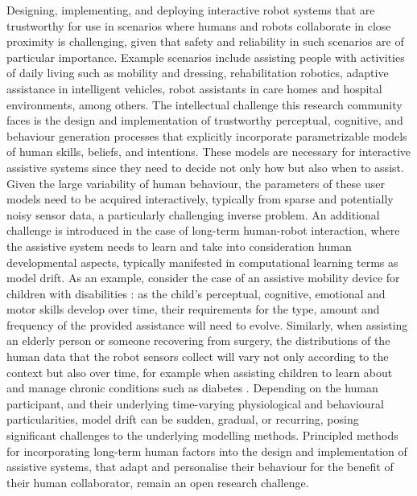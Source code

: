 \documentclass[sigconf]{acmart}
\begin{document}
Designing, implementing, and deploying interactive robot systems that are trustworthy for use in scenarios where humans and robots collaborate in close proximity is challenging, given that safety and reliability in such scenarios are of particular importance. Example scenarios include assisting people with activities of daily living such as mobility \cite{SohDemiris2015} and dressing\cite{GaoEtAl2020}, rehabilitation robotics, adaptive assistance in intelligent vehicles, robot assistants in care homes and hospital environments, among others. The intellectual challenge this research community faces is the design and implementation of trustworthy perceptual, cognitive, and behaviour generation processes that explicitly incorporate parametrizable models of human skills, beliefs, and intentions\cite{Demiris2007}. These models are necessary for interactive assistive systems since they need to decide not only how but also when to assist\cite{Demiris2009, GeorgiouDemiris}.  Given the large variability of human behaviour, the parameters of these user models need to be acquired interactively, typically from sparse and potentially noisy sensor data, a particularly challenging inverse problem. An additional challenge is introduced in the case of long-term human-robot interaction, where the assistive system needs to learn and take into consideration human developmental aspects, typically manifested in computational learning terms as model drift. As an example, consider the case of an assistive mobility device for children with disabilities \cite{SohDemiris2015}: as the child’s perceptual, cognitive, emotional and motor skills develop over time, their requirements for the type, amount and frequency of the provided assistance will need to evolve. Similarly, when assisting an elderly person or someone recovering from surgery, the distributions of the human data that the robot sensors collect will vary not only according to the context but also over time, for example when assisting children to learn about and manage chronic conditions such as diabetes \cite{KapteinEtAl2022}.  Depending on the human participant, and their underlying time-varying physiological and behavioural particularities,  model drift can be sudden, gradual, or recurring, posing significant challenges to the underlying modelling methods. Principled methods for incorporating long-term human factors into the design and implementation of assistive systems, that adapt and personalise their behaviour for the benefit of their human collaborator, remain an open research challenge. 
\end{document}
